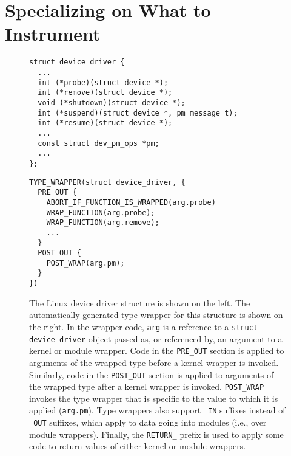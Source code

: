 \documentclass[preprint]{sigplanconf}
\begin{document}

\section{Specializing on What to Instrument}

\begin{figure*}[ht!]
\lstset{language=C, tabsize=2, stepnumber=1}
\begin{multicols}{2}
\begin{lstlisting}[basicstyle=\footnotesize\ttfamily]
struct device_driver {
  ...
  int (*probe)(struct device *);
  int (*remove)(struct device *);
  void (*shutdown)(struct device *);
  int (*suspend)(struct device *, pm_message_t);
  int (*resume)(struct device *);
  ...
  const struct dev_pm_ops *pm;
  ...
};
\end{lstlisting}
\columnbreak
\begin{lstlisting}[basicstyle=\footnotesize\ttfamily]
TYPE_WRAPPER(struct device_driver, {
  PRE_OUT {
    ABORT_IF_FUNCTION_IS_WRAPPED(arg.probe)
    WRAP_FUNCTION(arg.probe);
    WRAP_FUNCTION(arg.remove);
    ...
  }
  POST_OUT {
    POST_WRAP(arg.pm);
  }
})
\end{lstlisting}
\end{multicols}
\caption{The Linux device driver structure is shown on the left. The automatically generated type wrapper for this structure is shown on the right. In the wrapper code, \texttt{arg} is a reference to a \texttt{struct device\_driver} object passed as, or referenced by, an argument to a kernel or module wrapper. Code in the \texttt{PRE\_OUT} section is applied to arguments of the wrapped type before a kernel wrapper is invoked. Similarly, code in the \texttt{POST\_OUT} section is applied to arguments of the wrapped type after a kernel wrapper is invoked. \texttt{POST\_WRAP} invokes the type wrapper that is specific to the value to which it is applied (\texttt{arg.pm}). Type wrappers also support \texttt{\_IN} suffixes instead of \texttt{\_OUT} suffixes, which apply to data going into modules (i.e., over module wrappers). Finally, the \texttt{RETURN\_} prefix is used to apply some code to return values of either kernel or module wrappers.}
\label{fig:type_wrapper}
\end{figure*}
\end{document}
